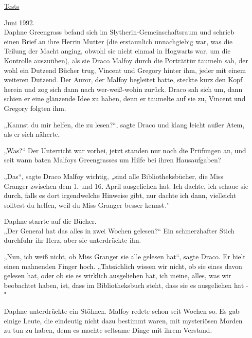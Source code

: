 

\hypertarget{tests}{%

\uline{Tests}

Juni 1992.\\ Daphne Greengrass befand sich im Slytherin-Gemeinschaftsraum und schrieb einen Brief an ihre Herrin Mutter (die erstaunlich unnachgiebig war, was die Teilung der Macht anging, obwohl sie nicht einmal in Hogwarts war, um die Kontrolle auszuüben), als sie Draco Malfoy durch die Porträttür taumeln sah, der wohl ein Dutzend Bücher trug, Vincent und Gregory hinter ihm, jeder mit einem weiteren Dutzend. Der Auror, der Malfoy begleitet hatte, steckte kurz den Kopf herein und zog sich dann nach wer-weiß-wohin zurück. Draco sah sich um, dann schien er eine glänzende Idee zu haben, denn er taumelte auf sie zu, Vincent und Gregory folgten ihm.

„Kannst du mir helfen, die zu lesen?“, sagte Draco und klang leicht außer Atem, als er sich näherte.

„Was?“ Der Unterricht war vorbei, jetzt standen nur noch die Prüfungen an, und seit wann baten Malfoys Greengrasses um Hilfe bei ihren Hausaufgaben?

„Das“, sagte Draco Malfoy wichtig, „sind alle Bibliotheksbücher, die Miss Granger zwischen dem 1. und 16. April ausgeliehen hat. Ich dachte, ich schaue sie durch, falls es dort irgendwelche Hinweise gibt, nur dachte ich dann, vielleicht solltest du helfen, weil du Miss Granger besser kennst."

Daphne starrte auf die Bücher.\\ „Der General hat das alles in zwei Wochen gelesen?“ Ein schmerzhafter Stich durchfuhr ihr Herz, aber sie unterdrückte ihn.

„Nun, ich weiß nicht, ob Miss Granger sie alle gelesen hat“, sagte Draco. Er hielt einen mahnenden Finger hoch. „Tatsächlich wissen wir nicht, ob sie eines davon gelesen hat, oder ob sie es wirklich ausgeliehen hat, ich meine, alles, was wir beobachtet haben, ist, dass im Bibliotheksbuch steht, dass sie es ausgeliehen hat -"

Daphne unterdrückte ein Stöhnen. Malfoy redete schon seit Wochen so. Es gab einige Leute, die eindeutig nicht dazu bestimmt waren, mit mysteriösen Morden zu tun zu haben, denn es machte seltsame Dinge mit ihrem Verstand.

}
